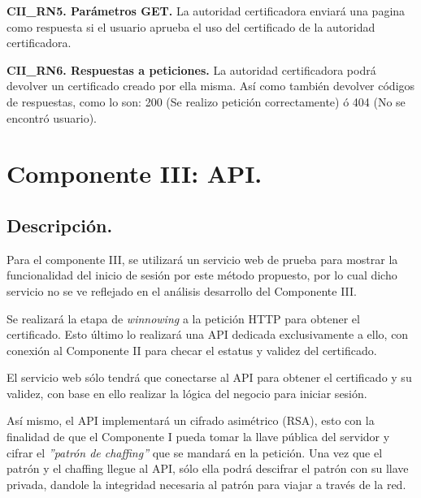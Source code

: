 \documentclass[12pt, a4paper, titlepage]{report}
\begin{document}
            \textbf{CII\_RN5. Parámetros GET.} La autoridad certificadora enviará una pagina como respuesta si el usuario aprueba el uso del certificado de la autoridad certificadora.\\
            \label{CII_RN5}
            
            \textbf{CII\_RN6. Respuestas a peticiones.} La autoridad certificadora podrá devolver un certificado creado por ella misma. Así como también devolver códigos de respuestas, como lo son: 200 (Se realizo petición correctamente) ó 404 (No se encontró usuario).\\
            \label{CII_RN6}
			
	       
        \section{Componente III: API.}
            
            \subsection{Descripción.}
	        
    	        Para el componente III, se utilizará un servicio web de prueba para mostrar la funcionalidad del inicio de sesión por este método propuesto, por lo cual dicho servicio no se ve reflejado en el análisis desarrollo del Componente III.
    	        
    	        Se realizará la etapa de \textit{winnowing} a la petición HTTP para obtener el certificado. Esto último lo realizará una API dedicada exclusivamente a ello, con conexión al Componente II para checar el estatus y validez del certificado. 
    	        
    	        El servicio web sólo tendrá que conectarse al API para obtener el certificado y su validez, con base en ello realizar la lógica del negocio para iniciar sesión.
    	        
    	        Así mismo, el API implementará un cifrado asimétrico (RSA), esto con la finalidad de que el Componente I pueda tomar la llave pública del servidor y cifrar el \textit{''patrón de chaffing''} que se mandará en la petición. Una vez que el patrón y el chaffing llegue al API, sólo ella podrá descifrar el patrón con su llave privada, dandole la integridad necesaria al patrón para viajar a través de la red.\\
                
\end{document}
